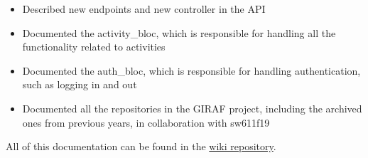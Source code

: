 \begin{itemize}
    \item Described new endpoints and new controller in the API
    \item Documented the activity\_bloc, which is responsible for handling all the functionality related to activities
    \item Documented the auth\_bloc, which is responsible for handling authentication, such as logging in and out
    \item Documented all the repositories in the GIRAF project, including the archived ones from previous years, in collaboration with sw611f19
\end{itemize}

All of this documentation can be found in the \href{https://github.com/aau-giraf/wiki}{wiki repository}.